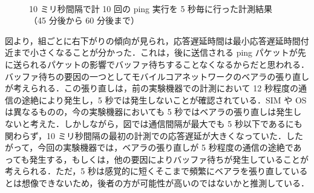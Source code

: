 \documentclass[a4j]{jarticle}
\begin{document}
\begin{figure}[tb]
\begin{center}
~
~
\caption{10 ミリ秒間隔で計 10 回の ping 実行を 5 秒毎に行った計測結果（45 分後から 60 分後まで）}
\label{data1-2}
\end{center}
\end{figure}

図より，組ごとに右下がりの傾向が見られ，応答遅延時間は最小応答遅延時間付近まで小さくなることが分かった．これは，後に送信される ping パケットが先に送られるパケットの影響でバッファ待ちすることなくなるからだと思われる．バッファ待ちの要因の一つとしてモバイルコアネットワークのベアラの張り直しが考えられる．この張り直しは，前の実験機器での計測において 12 秒程度の通信の途絶により発生し，5 秒では発生しないことが確認されている．SIM や OS は異なるものの，今の実験機器においても 5 秒ではベアラの張り直しは発生しないと考えた．しかしながら，図では通信間隔が最大でも 5 秒以下であるにも関わらず，10 ミリ秒間隔の最初の計測での応答遅延が大きくなっていた．したがって，今回の実験機器では，ベアラの張り直しが 5 秒程度の通信の途絶であっても発生する，もしくは，他の要因によりバッファ待ちが発生していることが考えられる．ただ，5 秒は感覚的に短くそこまで頻繁にベアラを張り直しているとは想像できないため，後者の方が可能性が高いのではないかと推測している．
\end{document}
